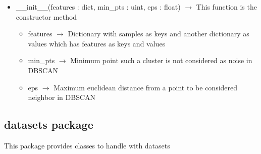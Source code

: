\begin{description}
\begin{itemize}
\item \_\_init\_\_(features : dict, min\_pts : uint, eps : float) $\rightarrow$ This function is the constructor method\begin{itemize}
\item features $\rightarrow$ Dictionary with samples as keys and another dictionary as values which has features as keys and values
\item min\_pts $\rightarrow$ Minimum point such a cluster is not considered as noise in DBSCAN
\item eps $\rightarrow$ Maximum euclidean distance from a point to be considered neighbor in DBSCAN
\end{itemize}

\end{itemize}

\end{description}
\subsection{datasets package}
This package provides classes to handle with datasets

